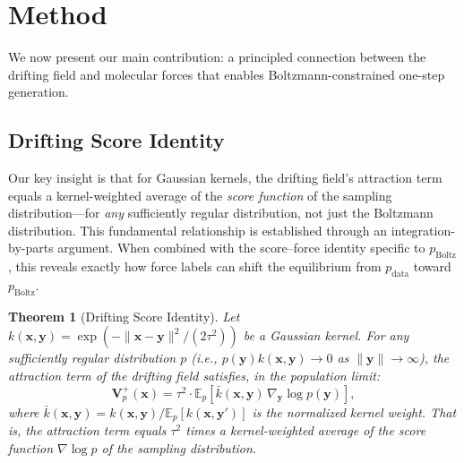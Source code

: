 \documentclass[11pt]{article}
\newtheorem{theorem}{Theorem}[section]
\newcommand{\bx}{\mathbf{x}}
\newcommand{\by}{\mathbf{y}}
\newcommand{\bV}{\mathbf{V}}
\newcommand{\E}{\mathbb{E}}
\newcommand{\kbar}{\bar{k}}
\newcommand{\pboltz}{p_{\text{Boltz}}}
\newcommand{\pdata}{p_{\text{data}}}
\begin{document}
\section{Method}
\label{sec:method}

We now present our main contribution: a principled connection between the drifting field and molecular forces that enables Boltzmann-constrained one-step generation.

\subsection{Drifting Score Identity}
\label{sec:identity}

Our key insight is that for Gaussian kernels, the drifting field's attraction term equals a kernel-weighted average of the \emph{score function} of the sampling distribution---for \emph{any} sufficiently regular distribution, not just the Boltzmann distribution. This fundamental relationship is established through an integration-by-parts argument.
When combined with the score--force identity specific to $\pboltz$, this reveals exactly how force labels can shift the equilibrium from $\pdata$ toward $\pboltz$.

\begin{theorem}[Drifting Score Identity]
\label{thm:main}
Let $k(\bx,\by) = \exp(-\|\bx-\by\|^2/(2\tau^2))$ be a Gaussian kernel.
For any sufficiently regular distribution $p$ (i.e., $p(\by)k(\bx,\by) \to 0$ as $\|\by\|\to\infty$), the attraction term of the drifting field satisfies, in the population limit:
\begin{equation}
    \bV_p^+(\bx) = \tau^2 \cdot \E_p\!\left[\kbar(\bx,\by)\,\nabla_\by \log p(\by)\right],
    \label{eq:main-identity}
\end{equation}
where $\kbar(\bx,\by) = k(\bx,\by)/\E_p[k(\bx,\by')]$ is the normalized kernel weight.
That is, the attraction term equals $\tau^2$ times a kernel-weighted average of the score function $\nabla \log p$ of the sampling distribution.
\end{theorem}
\end{document}
